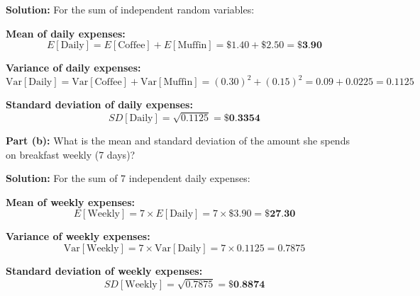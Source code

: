 \documentclass[
  11pt,
]{article}
\begin{document}
\textbf{Solution:} For the sum of independent random variables:

\textbf{Mean of daily expenses:}
\[E[\text{Daily}] = E[\text{Coffee}] + E[\text{Muffin}] = \$1.40 + \$2.50 = \textbf{\$3.90}\]

\textbf{Variance of daily expenses:}
\[\text{Var}[\text{Daily}] = \text{Var}[\text{Coffee}] + \text{Var}[\text{Muffin}] = (0.30)^2 + (0.15)^2 = 0.09 + 0.0225 = 0.1125\]

\textbf{Standard deviation of daily expenses:}
\[SD[\text{Daily}] = \sqrt{0.1125} = \textbf{\$0.3354}\]

\textbf{Part (b):} What is the mean and standard deviation of the amount
she spends on breakfast weekly (7 days)?

\textbf{Solution:} For the sum of 7 independent daily expenses:

\textbf{Mean of weekly expenses:}
\[E[\text{Weekly}] = 7 \times E[\text{Daily}] = 7 \times \$3.90 = \textbf{\$27.30}\]

\textbf{Variance of weekly expenses:}
\[\text{Var}[\text{Weekly}] = 7 \times \text{Var}[\text{Daily}] = 7 \times 0.1125 = 0.7875\]

\textbf{Standard deviation of weekly expenses:}
\[SD[\text{Weekly}] = \sqrt{0.7875} = \textbf{\$0.8874}\]
\end{document}
